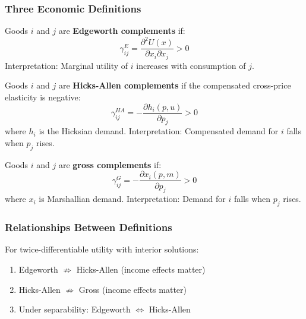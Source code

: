 \subsubsection{Three Economic Definitions}

\begin{definition}
Goods $i$ and $j$ are \textbf{Edgeworth complements} if:
\begin{equation}
\gamma^E_{ij} = \frac{\partial^2 U(x)}{\partial x_i \partial x_j} > 0
\end{equation}
Interpretation: Marginal utility of $i$ increases with consumption of $j$.
\end{definition}

\begin{definition}
Goods $i$ and $j$ are \textbf{Hicks-Allen complements} if the compensated cross-price elasticity is negative:
\begin{equation}
\gamma^{HA}_{ij} = -\frac{\partial h_i(p, u)}{\partial p_j} > 0
\end{equation}
where $h_i$ is the Hicksian demand. Interpretation: Compensated demand for $i$ falls when $p_j$ rises.
\end{definition}

\begin{definition}
Goods $i$ and $j$ are \textbf{gross complements} if:
\begin{equation}
\gamma^G_{ij} = -\frac{\partial x_i(p, m)}{\partial p_j} > 0
\end{equation}
where $x_i$ is Marshallian demand. Interpretation: Demand for $i$ falls when $p_j$ rises.
\end{definition}

\subsubsection{Relationships Between Definitions}

\begin{theorem}
For twice-differentiable utility with interior solutions:
\begin{enumerate}
    \item Edgeworth $\not\Rightarrow$ Hicks-Allen (income effects matter)
    \item Hicks-Allen $\not\Rightarrow$ Gross (income effects matter)
    \item Under separability: Edgeworth $\Leftrightarrow$ Hicks-Allen
\end{enumerate}
\end{theorem}

